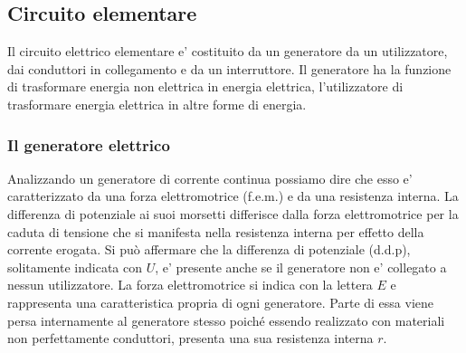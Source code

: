 \documentclass[a4paper, 10pt]{article}
\begin{document}
		\subsection{Circuito elementare}
			Il circuito elettrico elementare e' costituito da un generatore da un utilizzatore, dai conduttori in collegamento e da 
			un interruttore. Il generatore ha la funzione di trasformare energia non elettrica in energia elettrica, 
			l'utilizzatore di trasformare energia elettrica in altre forme di energia.
			\subsubsection{Il generatore elettrico}
				Analizzando un generatore di corrente continua possiamo dire che esso e' caratterizzato da una forza 
				elettromotrice (f.e.m.) e da una resistenza interna. La differenza di potenziale ai suoi morsetti differisce dalla
				forza elettromotrice per la caduta di tensione che si manifesta nella resistenza interna per effetto della 
				corrente erogata. Si può affermare che la differenza di potenziale (d.d.p), solitamente indicata con $U$,
				e' presente anche se il generatore non e' collegato a nessun utilizzatore. La forza elettromotrice si indica con
				la lettera $E$ e rappresenta una caratteristica propria di ogni generatore. Parte di essa viene persa internamente 
				al generatore stesso poiché essendo realizzato con materiali non perfettamente conduttori, presenta una sua 
				resistenza interna $r$.  
\end{document}
